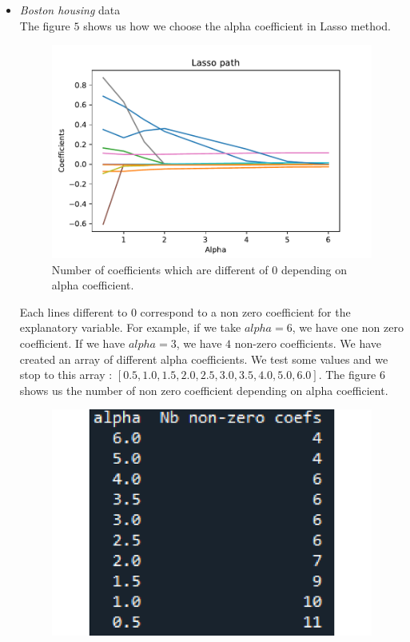\documentclass{article}
\begin{document}
\begin{itemize}
    \item \textit{Boston housing} data\\
The figure $5$ shows us how we choose the alpha coefficient in Lasso method.
\begin{figure}[!ht]
    \centering
    \includegraphics[scale=0.6]{./images/alpha_choice_lasso_house.pdf}
    \caption{Number of coefficients which are different of $0$ depending on alpha coefficient.}
\end{figure}
Each lines different to $0$ correspond to a non zero coefficient for the explanatory variable. For example, if we take $alpha=6$, we have one non zero coefficient. If we have $alpha=3$, we have $4$ non-zero coefficients. We have created an array of different alpha coefficients. We test some values and we stop to this array : $[0.5, 1.0, 1.5, 2.0, 2.5, 3.0, 3.5, 4.0, 5.0, 6.0]$. The figure $6$ shows us the number of non zero coefficient depending on alpha coefficient.
\begin{figure}[!ht]
    \centering
    \includegraphics[scale=0.2]{./images/nb_non_zero_house.pdf}

\end{figure}
\end{itemize}
\end{document}

